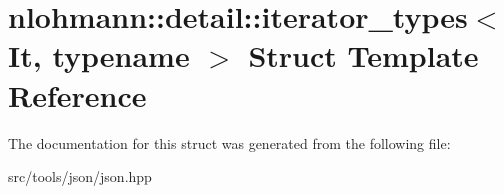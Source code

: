 \hypertarget{structnlohmann_1_1detail_1_1iterator__types}{}\section{nlohmann\+:\+:detail\+:\+:iterator\+\_\+types$<$ It, typename $>$ Struct Template Reference}
\label{structnlohmann_1_1detail_1_1iterator__types}


The documentation for this struct was generated from the following file\+:\begin{DoxyCompactItemize}
\item 
src/tools/json/json.\+hpp\end{DoxyCompactItemize}
